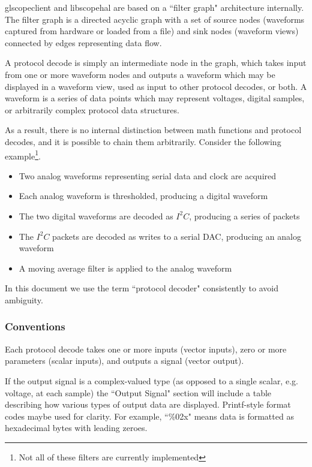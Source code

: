 \documentclass[11pt]{article}
\begin{document}
glscopeclient and libscopehal are based on a ``filter graph" architecture internally. The filter graph is a directed
acyclic graph with a set of source nodes (waveforms captured from hardware or loaded from a file) and sink nodes
(waveform views) connected by edges representing data flow.

A protocol decode is simply an intermediate node in the graph, which takes input from one or more waveform nodes and
outputs a waveform which may be displayed in a waveform view, used as input to other protocol decodes, or both. A
waveform is a series of data points which may represent voltages, digital samples, or arbitrarily complex protocol data
structures.

As a result, there is no internal distinction between math functions and protocol decodes, and it is possible to chain
them arbitrarily. Consider the following example\footnote{Not all of these filters are currently implemented}.

\begin{itemize}
\item Two analog waveforms representing serial data and clock are acquired
\item Each analog waveform is thresholded, producing a digital waveform
\item The two digital waveforms are decoded as $I^2C$, producing a series of packets
\item The $I^2C$ packets are decoded as writes to a serial DAC, producing an analog waveform
\item A moving average filter is applied to the analog waveform
\end{itemize}

In this document we use the term ``protocol decoder" consistently to avoid ambiguity.

\subsubsection{Conventions}

Each protocol decode takes one or more inputs (vector inputs), zero or more parameters (scalar inputs), and outputs a
signal (vector output).

If the output signal is a complex-valued type (as opposed to a single scalar, e.g. voltage, at each sample) the
``Output Signal" section will include a table describing how various types of output data are displayed. Printf-style
format codes maybe used for clarity. For example, ``\%02x" means data is formatted as hexadecimal bytes with leading
zeroes.
\end{document}
